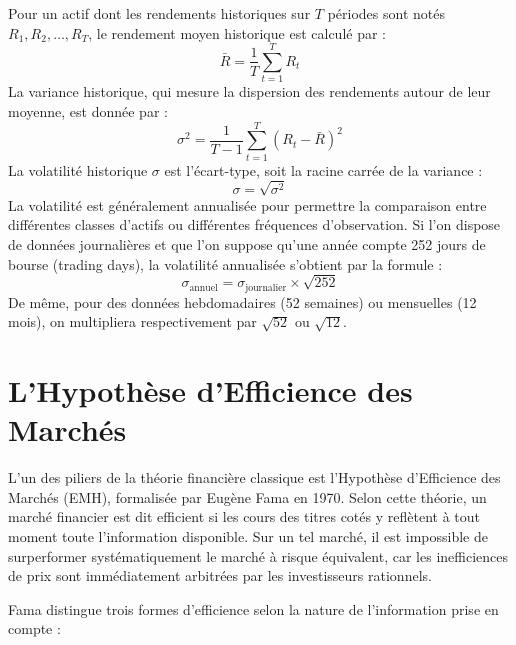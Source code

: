 Pour un actif dont les rendements historiques sur $T$ périodes sont notés $R_1, R_2, \dots, R_T$, le rendement moyen historique est calculé par :
\begin{equation}
    \bar{R} = \frac{1}{T} \sum_{t=1}^{T} R_t
\end{equation}
La variance historique, qui mesure la dispersion des rendements autour de leur moyenne, est donnée par :
\begin{equation}
    \sigma^2 = \frac{1}{T-1} \sum_{t=1}^{T} (R_t - \bar{R})^2
\end{equation}
La volatilité historique $\sigma$ est l'écart-type, soit la racine carrée de la variance :
\begin{equation}
    \sigma = \sqrt{\sigma^2}
\end{equation}
La volatilité est généralement annualisée pour permettre la comparaison entre différentes classes d'actifs ou différentes fréquences d'observation. Si l'on dispose de données journalières et que l'on suppose qu'une année compte 252 jours de bourse (trading days), la volatilité annualisée s'obtient par la formule :
\begin{equation}
    \sigma_{\text{annuel}} = \sigma_{\text{journalier}} \times \sqrt{252}
\end{equation}
De même, pour des données hebdomadaires (52 semaines) ou mensuelles (12 mois), on multipliera respectivement par $\sqrt{52}$ ou $\sqrt{12}$.

\section{L'Hypothèse d'Efficience des Marchés}
L'un des piliers de la théorie financière classique est l'Hypothèse d'Efficience des Marchés (EMH), formalisée par Eugène Fama en 1970. Selon cette théorie, un marché financier est dit efficient si les cours des titres cotés y reflètent à tout moment toute l'information disponible. Sur un tel marché, il est impossible de surperformer systématiquement le marché à risque équivalent, car les inefficiences de prix sont immédiatement arbitrées par les investisseurs rationnels.

Fama distingue trois formes d'efficience selon la nature de l'information prise en compte :

